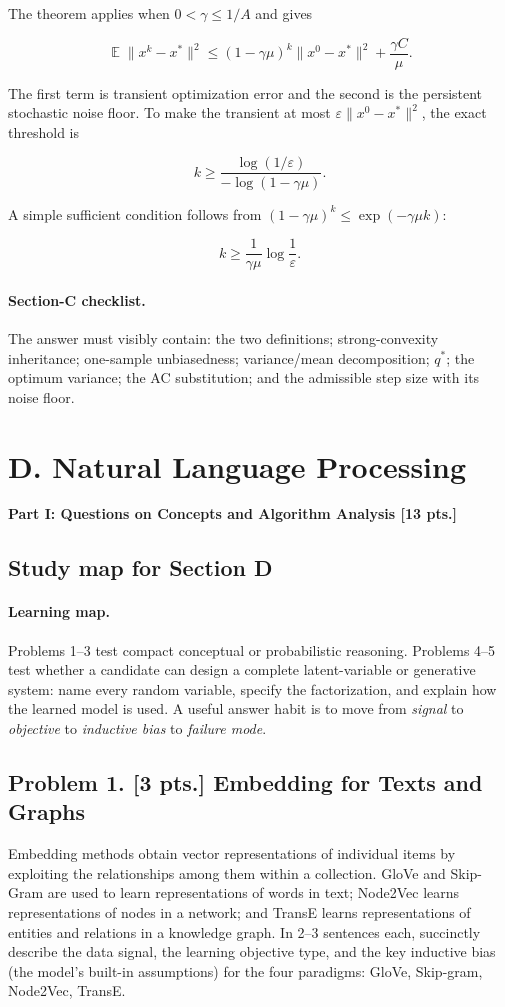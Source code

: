 \documentclass[11pt,a4paper]{article}
\DeclareMathOperator{\E}{\mathbb{E}}
\begin{document}
The theorem applies when $0<\gamma\leq 1/A$ and gives

\[
\E\|x^k-x^*\|^2
\leq(1-\gamma\mu)^k\|x^0-x^*\|^2+\frac{\gamma C}{\mu}.
\]

The first term is transient optimization error and the second is the persistent stochastic noise floor. To make the transient at most $\varepsilon\|x^0-x^*\|^2$, the exact threshold is

\[
k\geq\frac{\log(1/\varepsilon)}{-\log(1-\gamma\mu)}.
\]

A simple sufficient condition follows from $(1-\gamma\mu)^k\leq \exp(-\gamma\mu k)$:

\[
k\geq \frac{1}{\gamma\mu}\log\frac1\varepsilon.
\]

\paragraph{Section-C checklist.}

The answer must visibly contain: the two definitions; strong-convexity inheritance; one-sample unbiasedness; variance/mean decomposition; $q^*$; the optimum variance; the AC substitution; and the admissible step size with its noise floor.


\section{D. Natural Language Processing}

\noindent\textbf{Part I: Questions on Concepts and Algorithm Analysis [13 pts.]}


\subsection{Study map for Section D}

\paragraph{Learning map.}

Problems 1--3 test compact conceptual or probabilistic reasoning. Problems 4--5 test whether a candidate can design a complete latent-variable or generative system: name every random variable, specify the factorization, and explain how the learned model is used. A useful answer habit is to move from \emph{signal} to \emph{objective} to \emph{inductive bias} to \emph{failure mode}.



\subsection{Problem 1. [3 pts.] Embedding for Texts and Graphs}
Embedding methods obtain vector representations of individual items by exploiting the relationships among them within a collection. GloVe and Skip-Gram are used to learn representations of words in text; Node2Vec learns representations of nodes in a network; and TransE learns representations of entities and relations in a knowledge graph. In 2--3 sentences each, succinctly describe the data signal, the learning objective type, and the key inductive bias (the model's built-in assumptions) for the four paradigms: GloVe, Skip-gram, Node2Vec, TransE.
\end{document}
